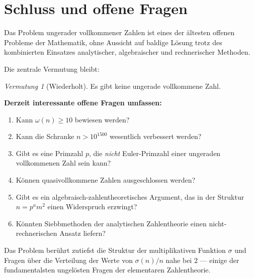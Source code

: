 \documentclass[12pt,a4paper]{amsart}
\theoremstyle{definition}
\theoremstyle{remark}
\newtheorem{vermutung}[theorem]{Vermutung}
\begin{document}
\section{Schluss und offene Fragen}

Das Problem ungerader vollkommener Zahlen ist eines der ältesten offenen
Probleme der Mathematik, ohne Aussicht auf baldige Lösung trotz des
kombinierten Einsatzes analytischer, algebraischer und rechnerischer Methoden.

Die zentrale Vermutung bleibt:

\begin{vermutung}[Wiederholt]
Es gibt keine ungerade vollkommene Zahl.
\end{vermutung}

\noindent\textbf{Derzeit interessante offene Fragen umfassen:}
\begin{enumerate}[label=(\arabic*)]
  \item Kann $\omega(n) \geq 10$ bewiesen werden?
  \item Kann die Schranke $n > 10^{1500}$ wesentlich verbessert werden?
  \item Gibt es eine Primzahl $p$, die \emph{nicht} Euler-Primzahl einer
        ungeraden vollkommenen Zahl sein kann?
  \item Können quasivollkommene Zahlen ausgeschlossen werden?
  \item Gibt es ein algebraisch-zahlentheoretisches Argument, das in der
        Struktur $n = p^a m^2$ einen Widerspruch erzwingt?
  \item Könnten Siebbmethoden der analytischen Zahlentheorie einen
        nicht-rechnerischen Ansatz liefern?
\end{enumerate}

Das Problem berührt zutiefst die Struktur der multiplikativen Funktion $\sigma$
und Fragen über die Verteilung der Werte von $\sigma(n)/n$ nahe bei $2$ ---
einige der fundamentalsten ungelösten Fragen der elementaren Zahlentheorie.
\end{document}
